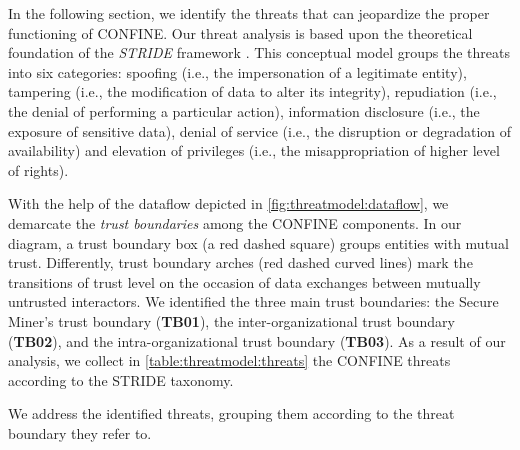 \begin{newj}
	

In the following section, we identify the threats that can jeopardize the proper functioning of CONFINE. Our threat analysis is based upon the theoretical foundation of the \textit{STRIDE} framework \cite{aa}. This conceptual model groups the threats into six categories: spoofing (i.e., the impersonation of a legitimate entity), tampering (i.e., the modification of data to alter its integrity), repudiation (i.e., the denial of performing a particular action), information disclosure (i.e., the exposure of sensitive data), denial of service (i.e., the disruption or degradation of availability) and elevation of privileges (i.e., the misappropriation of higher level of rights). 

With the help of the dataflow depicted in \cref{fig:threatmodel:dataflow}, we demarcate the \textit{trust boundaries} among the CONFINE components. In our diagram, a trust boundary box (a red dashed square) groups entities with mutual trust. Differently, trust boundary arches (red dashed curved lines) mark the transitions of trust level on the occasion of data exchanges between mutually untrusted interactors. We identified the three main trust boundaries: the Secure Miner's trust boundary (\textbf{TB01}), the inter-organizational trust boundary (\textbf{TB02}), and the intra-organizational trust boundary (\textbf{TB03}). As a result of our analysis, we collect in \cref{table:threatmodel:threats} the CONFINE threats according to the STRIDE taxonomy.

We address the identified threats, grouping them according to the threat boundary they refer to.  
	

\end{newj}
